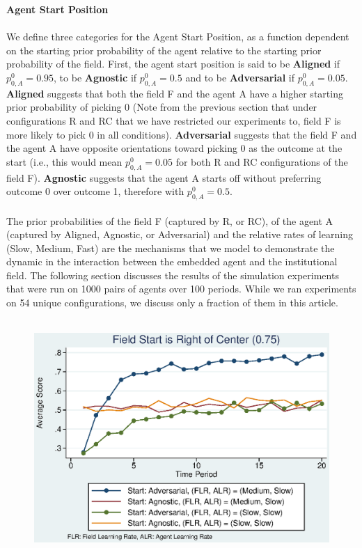 \documentclass[12pt,letterpaper]{article}
\begin{document}
\textbf{Agent Start Position}\\\\
We define three categories for the Agent Start Position, as a function dependent on the starting prior probability of the agent relative to the starting prior probability of the field. First, the agent start position is said to be \textbf{Aligned} if $p_{0,A}^0 = 0.95$, to be \textbf{Agnostic} if $p_{0,A}^0 = 0.5$ and to be \textbf{Adversarial} if $p_{0,A}^0 = 0.05$. \textbf{Aligned} suggests that both the field F and the agent A have a higher starting prior probability of picking 0 (Note from the previous section that under configurations R and RC that we have restricted our experiments to, field F is more likely to pick 0 in all conditions). \textbf{Adversarial} suggests that the field F and the agent A have opposite orientations toward picking 0 as the outcome at the start (i.e., this would mean $p_{0,A}^0 = 0.05$ for both R and RC configurations of the field F). \textbf{Agnostic} suggests that the agent A starts off without preferring outcome 0 over outcome 1, therefore with $p_{0,A}^0 = 0.5$.\\\\

\noindent The prior probabilities of the field F (captured by R, or RC), of the agent A (captured by Aligned, Agnostic, or Adversarial) and the relative rates of learning (Slow, Medium, Fast) are the mechanisms that we model to demonstrate the dynamic in the interaction between the embedded agent and the institutional field. The following section discusses the results of the simulation experiments that were run on 1000 pairs of agents over 100 periods. While we ran experiments on 54 unique configurations, we discuss only a fraction of them in this article.\\\\
\begin{figure}[h]
\begin{centering}
  \includegraphics[width=\textwidth]{frcmedium3a}
  \caption{}
  \label{fig:3a}
\end{centering}
\end{figure}
\end{document}
